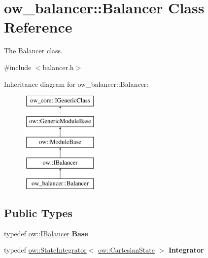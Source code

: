 \hypertarget{classow__balancer_1_1Balancer}{}\section{ow\+\_\+balancer\+:\+:Balancer Class Reference}
\label{classow__balancer_1_1Balancer}


The \hyperlink{classow__balancer_1_1Balancer}{Balancer} class.  




{\ttfamily \#include $<$balancer.\+h$>$}

Inheritance diagram for ow\+\_\+balancer\+:\+:Balancer\+:\begin{figure}[H]
\begin{center}
\leavevmode
\includegraphics[height=5.000000cm]{dd/d7e/classow__balancer_1_1Balancer}
\end{center}
\end{figure}
\subsection*{Public Types}
\begin{DoxyCompactItemize}
\item 
typedef \hyperlink{classow_1_1IBalancer}{ow\+::\+I\+Balancer} {\bfseries Base}\hypertarget{classow__balancer_1_1Balancer_aad56cea150ef756f9a9c2e4bfa3b674b}{}\label{classow__balancer_1_1Balancer_aad56cea150ef756f9a9c2e4bfa3b674b}

\item 
typedef \hyperlink{classow__core_1_1StateIntegrator}{ow\+::\+State\+Integrator}$<$ \hyperlink{classow__core_1_1CartesianState}{ow\+::\+Cartesian\+State} $>$ {\bfseries Integrator}\hypertarget{classow__balancer_1_1Balancer_acfe1763c046d37bdb0016a2800bea8d5}{}\label{classow__balancer_1_1Balancer_acfe1763c046d37bdb0016a2800bea8d5}

\end{DoxyCompactItemize}
